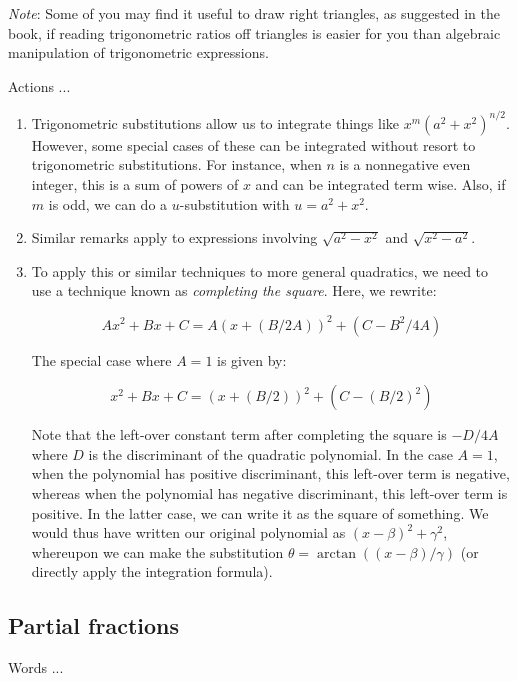\documentclass[10pt]{amsart}
\begin{document}
{\em Note}: Some of you may find it useful to draw right triangles, as
suggested in the book, if reading trigonometric ratios off triangles
is easier for you than algebraic manipulation of trigonometric
expressions.

Actions ...

\begin{enumerate}
\item Trigonometric substitutions allow us to integrate things like
  $x^m(a^2 + x^2)^{n/2}$. However, some special cases of these can be
  integrated without resort to trigonometric substitutions. For
  instance, when $n$ is a nonnegative even integer, this is a sum of
  powers of $x$ and can be integrated term wise. Also, if $m$ is odd,
  we can do a $u$-substitution with $u = a^2 + x^2$.
\item Similar remarks apply to expressions involving $\sqrt{a^2 -
  x^2}$ and $\sqrt{x^2 - a^2}$.
\item To apply this or similar techniques to more general quadratics,
  we need to use a technique known as {\em completing the
  square}. Here, we rewrite:

  $$Ax^2 + Bx + C = A(x + (B/2A))^2 + (C - B^2/4A)$$

  The special case where $A = 1$ is given by:

  $$x^2 + Bx + C = (x + (B/2))^2 + (C - (B/2)^2)$$

  Note that the left-over constant term after completing the square is
  $-D/4A$ where $D$ is the discriminant of the quadratic
  polynomial. In the case $A = 1$, when the polynomial has positive
  discriminant, this left-over term is negative, whereas when the
  polynomial has negative discriminant, this left-over term is
  positive. In the latter case, we can write it as the square of
  something. We would thus have written our original polynomial as $(x
  - \beta)^2 + \gamma^2$, whereupon we can make the substitution
  $\theta = \arctan((x - \beta)/\gamma)$ (or directly apply the
  integration formula).
\end{enumerate}

\subsection{Partial fractions}

Words ...
\end{document}
